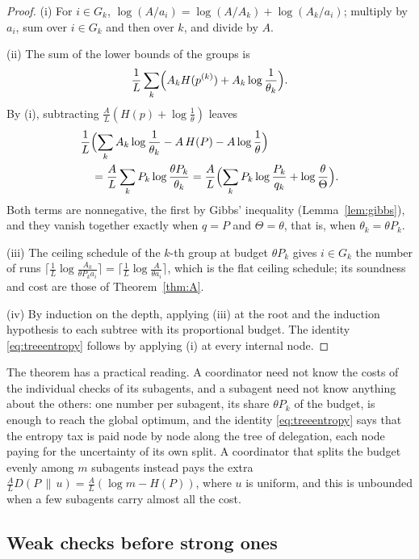 \begin{proof}
(i) For $i\in G_{k}$, $\log(A/a_{i})=\log(A/A_{k})+\log(A_{k}/a_{i})$; multiply by $a_{i}$, sum over $i\in G_{k}$ and then over $k$, and divide by $A$.

(ii) The sum of the lower bounds of the groups is
\[
\frac1L\sum_{k}\Bigl(A_{k}H(p^{(k)})+A_{k}\log\frac1{\theta_{k}}\Bigr).
\]
By (i), subtracting $\frac AL(H(p)+\log\frac1\theta)$ leaves
\[
\begin{aligned}
&\frac1L\Bigl(\sum_{k}A_{k}\log\frac1{\theta_{k}}-A\,H(P)-A\log\frac1\theta\Bigr)\\
&\quad=\frac AL\sum_{k}P_{k}\log\frac{\theta P_{k}}{\theta_{k}}=\frac AL\Bigl(\sum_{k}P_{k}\log\frac{P_{k}}{q_{k}}+\log\frac\theta\Theta\Bigr).
\end{aligned}
\]
Both terms are nonnegative, the first by Gibbs' inequality (Lemma~\ref{lem:gibbs}), and they vanish together exactly when $q=P$ and $\Theta=\theta$, that is, when $\theta_{k}=\theta P_{k}$.

(iii) The ceiling schedule of the $k$-th group at budget $\theta P_{k}$ gives $i\in G_{k}$ the number of runs $\lceil\frac1L\log\frac{A_{k}}{\theta P_{k}a_{i}}\rceil=\lceil\frac1L\log\frac{A}{\theta a_{i}}\rceil$, which is the flat ceiling schedule; its soundness and cost are those of Theorem~\ref{thm:A}.

(iv) By induction on the depth, applying (iii) at the root and the induction hypothesis to each subtree with its proportional budget. The identity \eqref{eq:treeentropy} follows by applying (i) at every internal node.
\end{proof}

The theorem has a practical reading. A coordinator need not know the costs of the individual checks of its subagents, and a subagent need not know anything about the others: one number per subagent, its share $\theta P_{k}$ of the budget, is enough to reach the global optimum, and the identity \eqref{eq:treeentropy} says that the entropy tax is paid node by node along the tree of delegation, each node paying for the uncertainty of its own split. A coordinator that splits the budget evenly among $m$ subagents instead pays the extra $\frac AL D(P\,\|\,u)=\frac AL(\log m-H(P))$, where $u$ is uniform, and this is unbounded when a few subagents carry almost all the cost.

\subsection{Weak checks before strong ones}

